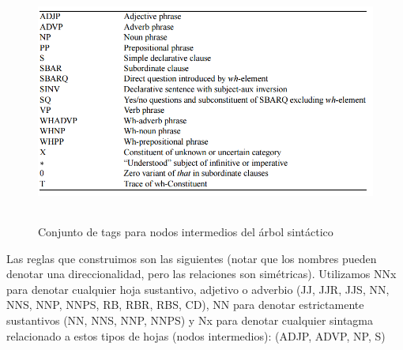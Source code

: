 \begin{figure}[H]
  \centering
    \includegraphics[width=12.823cm,height=8.004cm]{graficos/fuentes/SyntaxTags.png}
  \caption{Conjunto de tags para nodos intermedios del árbol sintáctico}
  \label{fig:syntax-tags}
\end{figure}


Las reglas que construimos son las siguientes (notar que los nombres pueden denotar una direccionalidad, pero las relaciones son simétricas).
Utilizamos NNx para denotar cualquier hoja sustantivo, adjetivo o adverbio (JJ, JJR, JJS, NN, NNS, NNP, NNPS, RB, RBR, RBS, CD), NN para denotar estrictamente sustantivos (NN, NNS, NNP, NNPS) y Nx para denotar cualquier sintagma relacionado a estos tipos de hojas (nodos intermedios): (ADJP, ADVP, NP, S)

